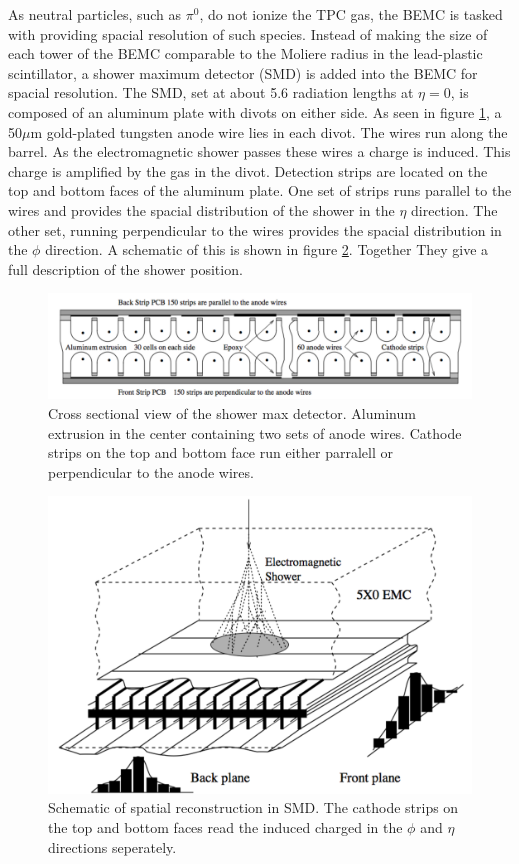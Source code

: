 \documentclass[abstract = on,listof=totoc, bibliography=totoc]{scrreprt}
\begin{document}
As neutral particles, such as $\pi^0$, do not ionize the TPC gas, the BEMC is tasked with providing spacial resolution of such species. Instead of making the size of each tower of the BEMC comparable to the Moliere radius in the lead-plastic scintillator, a shower maximum detector (SMD) is added into the BEMC for spacial resolution. The SMD, set at about 5.6 radiation lengths at $\eta=0$, is composed of an aluminum plate with divots on either side. As seen in figure \ref{fig:SMD2}, a 50$\mu$m gold-plated tungsten anode wire lies in each divot. The wires run along the barrel. As the electromagnetic shower passes these wires a charge is induced. This charge is amplified by the gas in the divot. Detection strips are located on the top and bottom faces of the aluminum plate. One set of strips runs parallel to the wires and provides the spacial distribution of the shower in the $\eta$ direction. The other set, running perpendicular to the wires provides the spacial distribution in the $\phi$ direction. A schematic of this is shown in figure \ref{fig:SMD1}. Together They give a full description of the shower position.\cite{BEMC}

\begin{figure}
\begin{center}
\includegraphics[width = .6\textwidth]{SMD2}
\caption[Shower Maximum Detector cross sectional view]{Cross sectional view of the shower max detector. Aluminum extrusion in the center containing two sets of anode wires. Cathode strips on the top and bottom face run either parralell or perpendicular to the anode wires.}
\label{fig:SMD2}
\end{center}
\end{figure}

\begin{figure}
\begin{center}
\includegraphics[width = .6\textwidth]{SMD1}
\caption[Spatial reconstruction in the SMD]{Schematic of spatial reconstruction in SMD. The cathode strips on the top and bottom faces read the induced charged in the $\phi$ and $\eta$ directions seperately.}
\label{fig:SMD1}
\end{center}
\end{figure}
\end{document}
